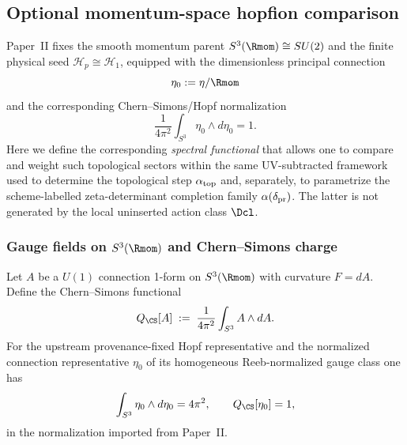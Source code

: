 \documentclass[11pt,a4paper]{article}
\begin{document}
\subsection{Optional momentum-space hopfion comparison}
\label{p3:sec:hopfions-spectral}


Paper~II fixes the smooth momentum parent \(S^3(\Rmom)\cong SU(2)\) and the finite physical seed \(\mathcal H_p\cong\mathcal H_1\), equipped with the dimensionless principal connection
\[
\eta_0:=\eta/\Rmom
\]
and the corresponding Chern--Simons/Hopf normalization
\[
\frac{1}{4\pi^2}\int_{S^3}\eta_0\wedge d\eta_0=1.
\]
Here we define the corresponding \emph{spectral functional} that allows one to compare and weight such
topological sectors within the same UV-subtracted framework used to determine
the topological step \(\alpha_{\rm top}\) and, separately, to parametrize the
scheme-labelled zeta-determinant completion family
\(\alpha(\delta_{\rm pr})\).  The latter is not generated by the local
uninserted action class \(\Dcl\).

\subsubsection{\texorpdfstring{Gauge fields on \(S^3(\Rmom)\) and Chern--Simons charge}{Gauge fields on S3(Rmom) and Chern-Simons charge}}

Let \(A\) be a \(U(1)\) connection 1-form on \(S^3(\Rmom)\) with curvature \(F=dA\). Define the
Chern--Simons functional
\begin{equation}
\label{p3:eq:CS-def}
Q_{\CS}[A] \;:=\; \frac{1}{4\pi^2}\int_{S^3} A\wedge dA.
\end{equation}
For the upstream provenance-fixed Hopf representative and the normalized
connection representative \(\eta_0\) of its homogeneous Reeb-normalized
gauge class one has
\[
\int_{S^3}\eta_0\wedge d\eta_0=4\pi^2,
\qquad
Q_{\CS}[\eta_0]=1,
\]
in the normalization imported from Paper~II.
\end{document}
